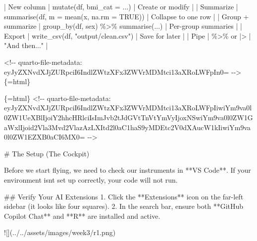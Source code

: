 \documentclass[
  letterpaper,
  DIV=11,
  numbers=noendperiod,
  oneside]{scrreprt}
\newenvironment{Shaded}{\begin{snugshade}}{\end{snugshade}}
\newcommand{\AlertTok}[1]{\textcolor[rgb]{0.68,0.00,0.00}{#1}}
\newcommand{\FunctionTok}[1]{\textcolor[rgb]{0.28,0.35,0.67}{#1}}
\newcommand{\InformationTok}[1]{\textcolor[rgb]{0.37,0.37,0.37}{#1}}
\newcommand{\NormalTok}[1]{\textcolor[rgb]{0.00,0.23,0.31}{#1}}
\newcommand{\PreprocessorTok}[1]{\textcolor[rgb]{0.68,0.00,0.00}{#1}}
\newcommand{\SpecialStringTok}[1]{\textcolor[rgb]{0.13,0.47,0.30}{#1}}
\begin{document}
\begin{Shaded}
\begin{Highlighting}[numbers=left,,]
\PreprocessorTok{|}\NormalTok{ New column }\PreprocessorTok{|} \InformationTok{\textasciigrave{}mutate(df, bmi\_cat = ...)\textasciigrave{}} \PreprocessorTok{|}\NormalTok{ Create or modify }\PreprocessorTok{|}
\PreprocessorTok{|}\NormalTok{ Summarize }\PreprocessorTok{|} \InformationTok{\textasciigrave{}summarise(df, m = mean(x, na.rm = TRUE))\textasciigrave{}} \PreprocessorTok{|}\NormalTok{ Collapse to one row }\PreprocessorTok{|}
\PreprocessorTok{|}\NormalTok{ Group + summarize }\PreprocessorTok{|} \InformationTok{\textasciigrave{}group\_by(df, sex) \%\textgreater{}\% summarise(...)\textasciigrave{}} \PreprocessorTok{|}\NormalTok{ Per{-}group summaries }\PreprocessorTok{|}
\PreprocessorTok{|}\NormalTok{ Export }\PreprocessorTok{|} \InformationTok{\textasciigrave{}write\_csv(df, "output/clean.csv")\textasciigrave{}} \PreprocessorTok{|}\NormalTok{ Save for later }\PreprocessorTok{|}
\PreprocessorTok{|}\NormalTok{ Pipe }\PreprocessorTok{|} \InformationTok{\textasciigrave{}\%\textgreater{}\%\textasciigrave{}}\NormalTok{ or }\InformationTok{\textasciigrave{}|\textgreater{}\textasciigrave{}} \PreprocessorTok{|}\NormalTok{ "And then..." }\PreprocessorTok{|}


\InformationTok{\textasciigrave{}\textless{}!{-}{-} quarto{-}file{-}metadata: eyJyZXNvdXJjZURpciI6IndlZWtzXFx3ZWVrMDMtci13aXRoLWFpIn0= {-}{-}\textgreater{}\textasciigrave{}}\NormalTok{\{=html\}}

\InformationTok{\textasciigrave{}\textasciigrave{}\textasciigrave{}\{=html\}}
\InformationTok{\textless{}!{-}{-} quarto{-}file{-}metadata: eyJyZXNvdXJjZURpciI6IndlZWtzXFx3ZWVrMDMtci13aXRoLWFpIiwiYm9va0l0ZW1UeXBlIjoiY2hhcHRlciIsImJvb2tJdGVtTnVtYmVyIjoxNSwiYm9va0l0ZW1GaWxlIjoid2Vla3Mvd2VlazAzLXItd2l0aC1haS9yMDEtc2V0dXAucW1kIiwiYm9va0l0ZW1EZXB0aCI6MX0= {-}{-}\textgreater{}}
\InformationTok{\textasciigrave{}\textasciigrave{}\textasciigrave{}}

\FunctionTok{\# The Setup (The Cockpit) }


\NormalTok{Before we start flying, we need to check our instruments in **VS Code**. If your environment isn\textquotesingle{}t set up correctly, your code will not run.}

\FunctionTok{\#\# Verify Your AI Extensions}
\SpecialStringTok{1. }\NormalTok{Click the **Extensions** icon on the far{-}left sidebar (it looks like four squares).}
\SpecialStringTok{2. }\NormalTok{In the search bar, ensure both **GitHub Copilot Chat** and **R** are installed and active. }

\AlertTok{![](../../assets/images/week3/r1.png)}


\end{Highlighting}
\end{Shaded}
\end{document}
